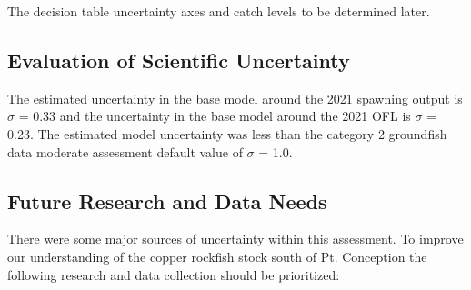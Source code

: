 \documentclass[11pt,
  english,
  a4paper,
]{article}
\begin{document}
\leavevmode\tagmcend\tagstructend\par


The decision table uncertainty axes and catch levels to be determined later.

\leavevmode\tagmcend\tagstructend\par


\hypertarget{evaluation-of-scientific-uncertainty}{%
\subsection{Evaluation of Scientific Uncertainty}\label{evaluation-of-scientific-uncertainty}}

\leavevmode\tagmcend\tagstructend


The estimated uncertainty in the base model around the 2021 spawning output is {\(\sigma\)\leavevmode\tagmcend\tagstructend} = 0.33 and the uncertainty in the base model around the 2021 OFL is {\(\sigma\)\leavevmode\tagmcend\tagstructend} = 0.23. The estimated model uncertainty was less than the category 2 groundfish data moderate assessment default value of {\(\sigma\)\leavevmode\tagmcend\tagstructend} = 1.0.

\leavevmode\tagmcend\tagstructend\par


\hypertarget{future-research-and-data-needs}{%
\subsection{Future Research and Data Needs}\label{future-research-and-data-needs}}

\leavevmode\tagmcend\tagstructend


There were some major sources of uncertainty within this assessment. To improve our understanding of the copper rockfish stock south of Pt. Conception the following research and data collection should be prioritized:

\leavevmode\tagmcend\tagstructend\par
\end{document}
